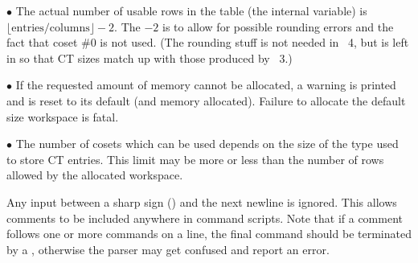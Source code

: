 $\bullet$
The actual number of usable rows in the table (the  internal
  variable) is $\lfloor \mathrm{entries}/\mathrm{columns} \rfloor - 2$.
The $-2$ is to allow for possible rounding errors and the fact that coset
  \#0 is not used.
(The rounding stuff is not needed in \ace\ 4, but is left in so that CT
  sizes match up with those produced by \ace\ 3.)

$\bullet$
If the requested amount of memory cannot be allocated, a warning is printed
  and  is reset to its default (and memory allocated).
Failure to allocate the default size workspace is fatal.

$\bullet$
The number of cosets which can be used depends on the size of the
   type used to store CT entries.
This limit may be more or less than the number of rows allowed by the
  allocated workspace.

\quad{}

Any input between a sharp sign (\ttt{\#}) and the next newline is ignored.
This allows comments to be included anywhere in command scripts.
Note that if a comment follows one or more commands on a line, the final
  command should be terminated by a \ttt{;}, otherwise the parser may get
  confused and report an error.


